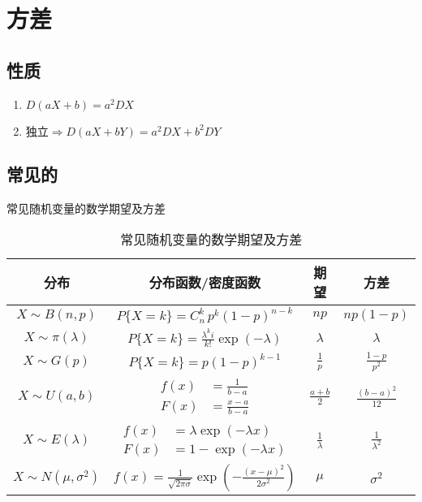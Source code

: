 \section{方差}
\label{sec:方差}

\subsection{性质}
\label{sub:性质}

\begin{enumerate}
    \item $D(aX+b) = a^2DX$
    \item $\text{独立} \Rightarrow D(aX+bY) = a^2DX + b^2DY$
\end{enumerate}

\subsection{常见的}
\label{sub:常见的}
常见随机变量的数学期望及方差

\begin{table}[htpb]
    \centering
    \caption{常见随机变量的数学期望及方差}
    \label{tab:label}
    \begin{tabular}{|c|c|c|c|}
        \hline
        分布                  & 分布函数/密度函数                                         & 期望                               & 方差              \\
        \hline
        $X \sim B(n,p)$       & $P\{X         = k\} = C_n^k \, p^k (1-p)^{n-k}$           & $np$                               & $np(1-p)$         \\
        \hline
        $X \sim \pi(\lambda)$ & $P\{X         = k\}=\frac{\lambda^ki}{k!}\exp(-\lambda)$  & $\lambda$                          & $\lambda$         \\
        \hline
        $X \sim G(p)$         & $P\{X                 = k\}=p(1-p)^{k-1}$                 & $\frac{1}{p}$                      & $\frac{1-p}{p^2}$ \\
        \hline
        $X \sim U(a,b)$ & $\begin{aligned}
            f(x) &=\frac{1}{b-a} \\
            F(x) &=\frac{x-a}{b-a}
        \end{aligned}$ & $\frac{a+b}{2}$ & $\frac{(b-a)^2}{12}$ \\
        \hline
        $X \sim E(\lambda)$   & $\begin{aligned}
            f(x) &= \lambda \exp(-\lambda x)\\
            F(x)&= 1-\exp(-\lambda x)
        \end{aligned}$ & $\frac{1}{\lambda}$ & $\frac{1}{\lambda^2}$ \\
        \hline
        $X \sim N(\mu,\sigma^2)$ & $f(x)=\frac{1}{\sqrt{2\pi\sigma}}\exp(-\frac{(x-\mu)^2}{2\sigma^2})$ & $\mu$ & $\sigma^2$ \\
        \hline
    \end{tabular}
\end{table}


